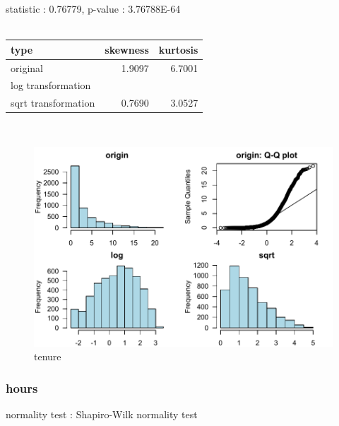 \documentclass{book}\usepackage[]{graphicx}\usepackage[]{color}
\begin{document}
\noindent statistic : 0.76779,  p-value : 3.76788E-64\\
\\%
\begin{tabular}{lrr}
  \toprule
type & skewness & kurtosis \\ 
  \midrule
original & 1.9097 & 6.7001 \\ 
  log transformation &  &  \\ 
  sqrt transformation & 0.7690 & 3.0527 \\ 
   \bottomrule
\end{tabular}
\\
\begin{figure}[!ht]
\centering
\includegraphics[width=1.0\textwidth]{figure/norm18.pdf}
\caption{tenure}
\end{figure}
\clearpage
\subsubsection{ hours }

normality test : Shapiro-Wilk normality test
\end{document}
